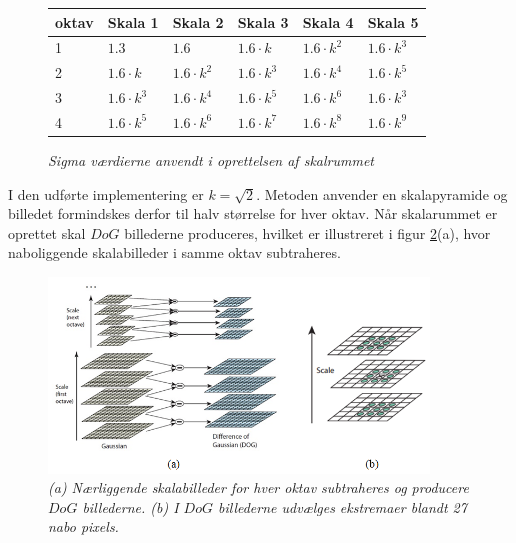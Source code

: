 \begin{figure}[H]
    \centering
    \begin{center}    
    \begin{tabular}{ | l | l | l | l | l | l | }
    \hline
    oktav & Skala 1 & Skala 2 & Skala 3 & Skala 4 & Skala 5 \\ \hline
    1 & $1.3$ & $1.6$ & $1.6 \cdot k$ & $1.6 \cdot k^2$ & $1.6 \cdot k^3$ \\ \hline
  	2 & $1.6 \cdot k$ & $1.6 \cdot k^2$ & $1.6 \cdot k^3$ & $1.6 \cdot k^4$ & $1.6 \cdot k^5$ \\ \hline
  	3 & $1.6 \cdot k^3$ & $1.6 \cdot k^4$ & $1.6 \cdot k^5$ & $1.6 \cdot k^6$ & $1.6 \cdot k^3$ \\ \hline
  	4 & $1.6 \cdot k^5$ & $1.6 \cdot k^6$ & $1.6 \cdot k^7$ & $1.6 \cdot k^8$ & $1.6 \cdot k^9$ \\ \hline
    \end{tabular}       
    \caption{{\footnotesize \textit{Sigma værdierne anvendt i oprettelsen af skalrummet}}}
    \label{fig:secderivfiltersize}
     \end{center}
     \vspace{-2.5em}
  \end{figure} \noindent
I den udførte implementering er $k=\sqrt{2}$.  Metoden anvender en skalapyramide og billedet formindskes derfor til halv størrelse for hver oktav. Når skalarummet er oprettet skal $DoG$ billederne produceres, hvilket er illustreret i figur \ref{fig:difference}(a), hvor naboliggende skalabilleder i samme oktav subtraheres. 
\begin{figure}[H]
    \centering
    \includegraphics[width=0.90\textwidth]{fig/30.png}
     \vspace{-1em}
    \begin{center}    
       \caption{{\footnotesize \textit{(a) Nærliggende skalabilleder for hver oktav subtraheres og producere $DoG$ billederne. (b) I  $DoG$ billederne udvælges ekstremaer blandt 27 nabo pixels.}}}
    \label{fig:difference}
     \end{center}
     \vspace{-2.5em}
  \end{figure} \noindent    
